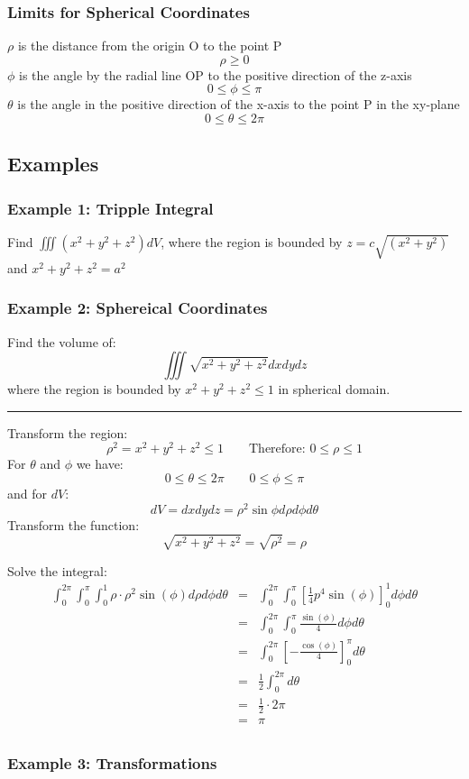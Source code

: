 \subsubsection{Limits for Spherical Coordinates}
$\rho$ is the distance from the origin O to the point P
$$\rho \geq 0$$
$\phi$ is the angle by the radial line OP to the positive direction of the z-axis
$$0\leq \phi \leq \pi$$
$\theta$ is the angle in the positive direction of the x-axis to the point P in the xy-plane
$$0\leq\theta \leq 2\pi$$

\subsection{Examples}
\subsubsection{Example 1: Tripple Integral}
Find $\iiint(x^{2}+y^{2}+z^{2})d V$, where the region is bounded by
$z=c\sqrt{(x^{2}+y^{2})}$ and $x^{2}+y^{2}+z^{2}=a^{2}$
\subsubsection{Example 2: Sphereical Coordinates}
Find the volume of:
$$\iiint\sqrt{x^2+y^2+z^2}dxdydz$$
where the region is bounded by $x^2+y^2+z^2\leq1$ in spherical domain.

\noindent\rule{\textwidth}{1pt}

Transform the region:
$$\rho^2=x^2+y^2+z^2\leq 1\qquad \text{Therefore: }0\leq\rho\leq 1$$
For $\theta$ and $\phi$ we have:
$$0\leq\theta\leq 2\pi\qquad 0\leq\phi\leq\pi$$
and for $dV$:
$$dV=dxdydz=\rho^2\sin\phi d\rho d\phi d\theta$$
Transform the function:
$$\sqrt{x^2+y^2+z^2}=\sqrt{\rho^2}=\rho$$

Solve the integral:
\begin{eqnarray*}
  \int_0^{2\pi}\int_0^\pi\int_0^1\rho\cdot\rho^2\sin(\phi) d\rho d\phi d\theta&=&\int_0^{2\pi}\int_0^\pi\left[\frac{1}{4} p^4 \sin (\phi)\right]^1_0d\phi d\theta\\
                                                                              &=& \int_0^{2\pi}\int_0^\pi\frac{\sin (\phi)}{4}d\phi d\theta\\
                                                                              &=& \int_0^{2\pi}\left[-\frac{\cos (\phi)}{4}\right]_0^\pi d\theta\\
                                                                              &=& \frac{1}{2}\int_0^{2\pi}d\theta\\
                                                                              &=& \frac{1}{2}\cdot 2\pi\\
                                                                              &=& \boxed{\pi}\\
\end{eqnarray*}

\subsubsection{Example 3: Transformations}
